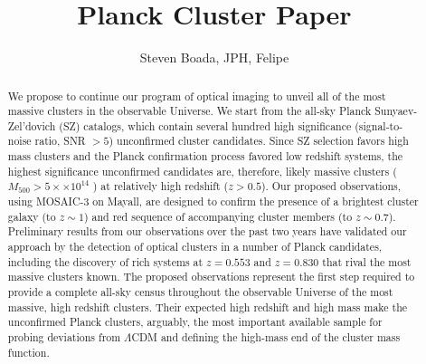\documentclass[apj, revtex4]{emulateapj}
\begin{document}
	
\title{Planck Cluster Paper}
	
\author{\sc Steven Boada, JPH, Felipe} 
	


\begin{abstract}
	\noindent We propose to continue our program of optical imaging to unveil all of the most massive clusters in
	the observable Universe. We start from the all-sky Planck Sunyaev-Zel’dovich (SZ) catalogs, which
	contain several hundred high significance (signal-to-noise ratio, SNR $> 5$) unconfirmed cluster
	candidates. Since SZ selection favors high mass clusters and the Planck confirmation process favored
	low redshift systems, the highest significance unconfirmed candidates are, therefore, likely massive
	clusters ($M_{500} > 5 ×\times 10^{14}$ \Msol) at relatively high redshift ($z > 0.5$). Our proposed observations,
	using MOSAIC-3 on Mayall, are designed to confirm the presence of a brightest cluster galaxy (to
	$z \sim 1$) and red sequence of accompanying cluster members (to $z \sim 0.7$). Preliminary results from
	our observations over the past two years have validated our approach by the detection of optical
	clusters in a number of Planck candidates, including the discovery of rich systems at $z = 0.553$ and
	$z = 0.830$ that rival the most massive clusters known. The proposed observations represent the first
	step required to provide a complete all-sky census throughout the observable Universe of the most
	massive, high redshift clusters. Their expected high redshift and high mass make the unconfirmed
	Planck clusters, arguably, the most important available sample for probing deviations from $\Lambda$CDM
	and defining the high-mass end of the cluster mass function.
\end{abstract}
\end{document}
